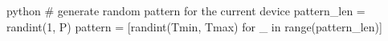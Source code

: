 \begin{mintedbox}{python}
# generate random pattern for the current device
pattern_len = randint(1, P)
pattern = [randint(Tmin, Tmax) for _ in range(pattern_len)]
\end{mintedbox}